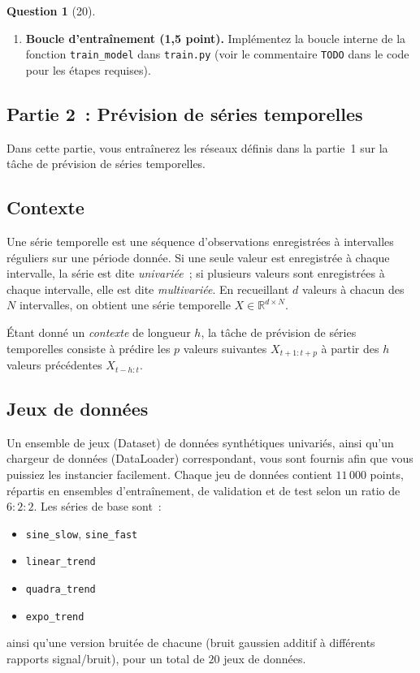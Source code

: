 \documentclass[12pt]{article}
\theoremstyle{definition}
\newtheorem{exercise}{Question}
\begin{document}
\begin{exercise}[20]
{\begin{enumerate}[label=\textbf{1.1.\arabic*}, leftmargin=*]
    \item \textbf{Boucle d'entraînement (1,5 point).} Implémentez la boucle interne de la fonction \texttt{train\_model} dans \texttt{train.py} (voir le commentaire
    \texttt{TODO} dans le code pour les étapes requises).
\end{enumerate}



\subsection*{Partie 2~: Prévision de séries temporelles}

Dans cette partie, vous entraînerez les réseaux définis dans la partie~1 sur la tâche de
prévision de séries temporelles.

\subsection*{Contexte}

Une série temporelle est une séquence d'observations enregistrées à intervalles réguliers sur
une période donnée. Si une seule valeur est enregistrée à chaque intervalle, la série est
dite \emph{univariée}~; si plusieurs valeurs sont enregistrées à chaque intervalle, elle est
dite \emph{multivariée}. En recueillant $d$ valeurs à chacun des $N$ intervalles, on obtient
une série temporelle $X \in \mathbb{R}^{d \times N}$.

Étant donné un \emph{contexte} de longueur $h$, la tâche de prévision de séries temporelles
consiste à prédire les $p$ valeurs suivantes $X_{t+1:t+p}$ à partir des $h$ valeurs
précédentes $X_{t-h:t}$.

\subsection*{Jeux de données}

Un ensemble de jeux (Dataset) de données synthétiques univariés, ainsi qu'un chargeur de données (DataLoader)
correspondant, vous sont fournis afin que vous puissiez les instancier facilement. Chaque jeu
de données contient $11\,000$ points, répartis en ensembles d'entraînement, de validation et
de test selon un ratio de $6:2:2$. Les séries de base sont~:
\begin{itemize}[nosep]
    \item \texttt{sine\_slow}, \texttt{sine\_fast}
    \item \texttt{linear\_trend}
    \item \texttt{quadra\_trend}
    \item \texttt{expo\_trend}
\end{itemize}
ainsi qu'une version bruitée de chacune (bruit gaussien additif à différents rapports
signal/bruit), pour un total de $20$ jeux de données.

}
\end{exercise}
\end{document}
